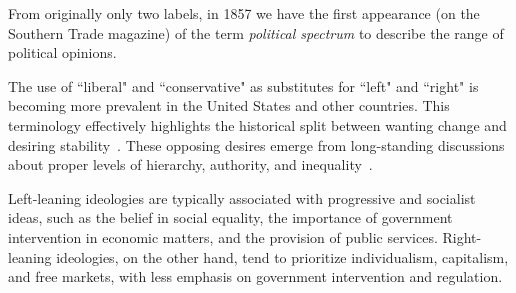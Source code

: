 From originally only two labels, in 1857 we have the first appearance (on the Southern Trade magazine) of the term \emph{political spectrum} to describe the range of political opinions.


The use of ``liberal" and ``conservative" as substitutes for ``left" and ``right" is becoming more prevalent in the United States and other countries.
This terminology effectively highlights the historical split between wanting change and desiring stability~\cite{jost2009political}.
These opposing desires emerge from long-standing discussions about proper levels of hierarchy, authority, and inequality~\citep{bobbio1996left}.





Left-leaning ideologies are typically associated with progressive and socialist ideas, such as the belief in social equality, the importance of government intervention in economic matters, and the provision of public services.
Right-leaning ideologies, on the other hand, tend to prioritize individualism, capitalism, and free markets, with less emphasis on government intervention and regulation.

